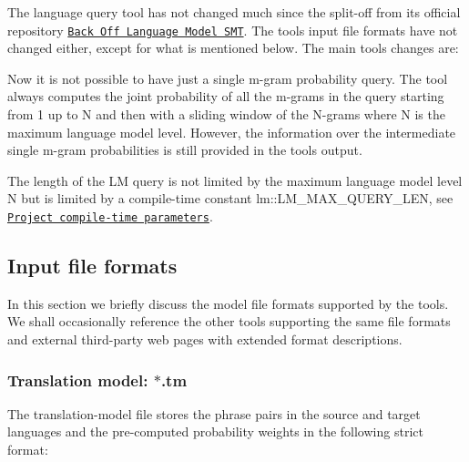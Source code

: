  The language query tool has not changed much since the split-\/off from its official repository \href{https://github.com/ivan-zapreev/Back-Off-Language-Model-SMT}{\tt Back Off Language Model S\+M\+T}. The tool\textquotesingle{}s input file formats have not changed either, except for what is mentioned below. The main tool\textquotesingle{}s changes are\+:


\begin{DoxyItemize}
\item Now it is not possible to have just a single m-\/gram probability query. The tool always computes the joint probability of all the m-\/grams in the query starting from 1 up to N and then with a sliding window of the N-\/grams where N is the maximum language model level. However, the information over the intermediate single m-\/gram probabilities is still provided in the tool\textquotesingle{}s output.
\item The length of the L\+M query is not limited by the maximum language model level N but is limited by a compile-\/time constant {\ttfamily lm\+::\+L\+M\+\_\+\+M\+A\+X\+\_\+\+Q\+U\+E\+R\+Y\+\_\+\+L\+E\+N}, see \href{#project-compile-time-parameters}{\tt Project compile-\/time parameters}.
\end{DoxyItemize}

\subsection*{Input file formats}

In this section we briefly discuss the model file formats supported by the tools. We shall occasionally reference the other tools supporting the same file formats and external third-\/party web pages with extended format descriptions.

\subsubsection*{Translation model\+: {\ttfamily $\ast$.tm}}

The translation-\/model file stores the phrase pairs in the source and target languages and the pre-\/computed probability weights in the following strict format\+:


